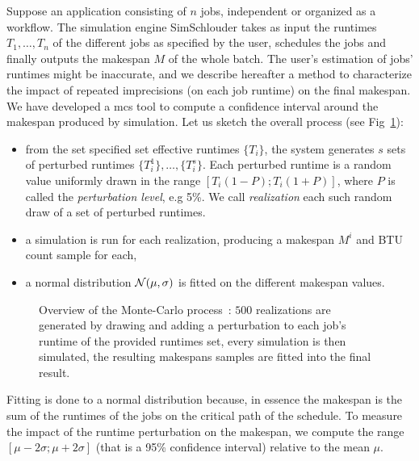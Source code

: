 \documentclass[10pt,conference,compsocconf]{IEEEtran}
\begin{document}
Suppose an  application consisting of  $n$ jobs,  independent or organized  as a
workflow.   The  simulation engine  SimSchlouder  takes  as input  the  runtimes
$T_1, \ldots ,  T_n$ of the different  jobs as specified by  the user, schedules
the jobs and  finally outputs the makespan  $M$ of the whole  batch.  The user's
estimation of  jobs' runtimes might be  inaccurate, and we describe  hereafter a
method to characterize the impact of repeated imprecisions (on each job runtime)
on the  final makespan.  We  have developed a \ac{mcs}  tool to compute a
confidence interval around the makespan produced   by   simulation.   Let   us
sketch   the   overall   process   (see Fig~\ref{fig:mc-process}):
\begin{itemize} 
\item from the set specified set effective runtimes $\{T_i\}$, the system
	generates $s$ sets of perturbed runtimes $\{T_i^1\}, \ldots, \{T_i^s\}$.
	Each perturbed runtime is a random value uniformly drawn in the range
	$[T_i (1-P); T_i (1+P)]$, where $P$ is called the \emph{perturbation
	level}, e.g 5\%. We call \emph{realization} each such random draw of a
	set of perturbed runtimes.
\item a simulation  is run for each realization, producing a makespan $M^i$ and
	BTU count sample for each,
\item  a  normal  distribution  ${\cal N}(\mu,\sigma)$  is  fitted  on
	the different makespan values.
\end{itemize}
\begin{figure}
	\centering
	\resizebox{0.5\textwidth}{!}{%
		
		}
\caption{Overview of the Monte-Carlo process~: $500$ realizations are generated
by drawing and adding a perturbation to each job's runtime of the provided
runtimes set, every simulation is then simulated, the resulting makespans
samples are fitted into the final result.}\label{fig:mc-process}
\end{figure}
Fitting is done to a normal distribution because, in essence the makespan is the
sum  of the  runtimes of  the jobs  on the  critical path  of the  schedule.  To
measure the impact  of the runtime perturbation on the  makespan, we compute the
range $[\mu-2\sigma;\mu+2\sigma]$ (that is  a 95\% confidence interval) relative
to  the mean  $\mu$. 
\end{document}
